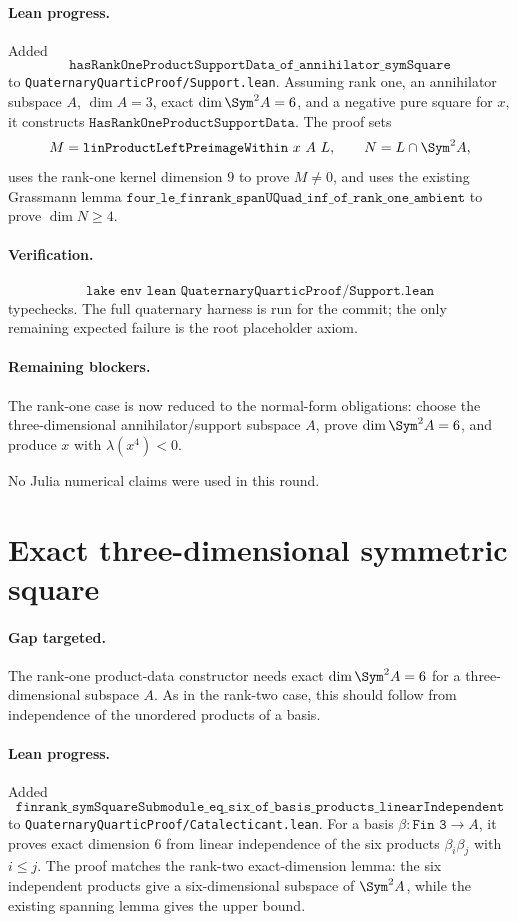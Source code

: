 \documentclass[11pt]{article}
\begin{document}
\paragraph{Lean progress.}
Added
\[
\texttt{hasRankOneProductSupportData\_of\_annihilator\_symSquare}
\]
to \texttt{QuaternaryQuarticProof/Support.lean}.  Assuming rank one, an
annihilator subspace \(A\), \(\dim A=3\), exact
\(\dim\Sym^2A=6\), and a negative pure square for \(x\), it constructs
\(\texttt{HasRankOneProductSupportData}\).  The proof sets
\[
M=\texttt{linProductLeftPreimageWithin}\ x\ A\ L,\qquad
N=L\cap\Sym^2A,
\]
uses the rank-one kernel dimension \(9\) to prove \(M\ne0\), and uses the
existing Grassmann lemma
\(\texttt{four\_le\_finrank\_spanUQuad\_inf\_of\_rank\_one\_ambient}\) to prove
\(\dim N\ge4\).

\paragraph{Verification.}
\[
\texttt{lake env lean QuaternaryQuarticProof/Support.lean}
\]
typechecks.  The full quaternary harness is run for the commit; the only
remaining expected failure is the root placeholder axiom.

\paragraph{Remaining blockers.}
The rank-one case is now reduced to the normal-form obligations: choose the
three-dimensional annihilator/support subspace \(A\), prove
\(\dim\Sym^2A=6\), and produce \(x\) with \(\lambda(x^4)<0\).

No Julia numerical claims were used in this round.

\section*{Exact three-dimensional symmetric square}

\paragraph{Gap targeted.}
The rank-one product-data constructor needs exact
\(\dim\Sym^2A=6\) for a three-dimensional subspace \(A\).  As in the rank-two
case, this should follow from independence of the unordered products of a
basis.

\paragraph{Lean progress.}
Added
\[
\texttt{finrank\_symSquareSubmodule\_eq\_six\_of\_basis\_products\_linearIndependent}
\]
to \texttt{QuaternaryQuarticProof/Catalecticant.lean}.  For a basis
\(\beta:\texttt{Fin 3}\to A\), it proves exact dimension \(6\) from linear
independence of the six products \(\beta_i\beta_j\) with \(i\le j\).  The proof
matches the rank-two exact-dimension lemma: the six independent products give
a six-dimensional subspace of \(\Sym^2A\), while the existing spanning lemma
gives the upper bound.
\end{document}
